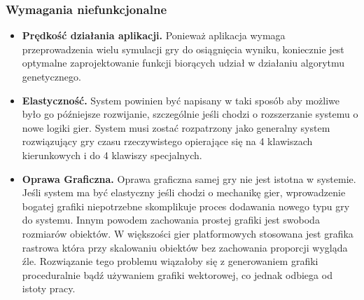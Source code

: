 \subsubsection{Wymagania niefunkcjonalne}
	\begin{itemize}
	\item {\bf Prędkość działania aplikacji. }	
	\newline
	Ponieważ aplikacja wymaga przeprowadzenia wielu symulacji gry do osiągnięcia wyniku, koniecznie jest optymalne zaprojektowanie funkcji biorących udział w działaniu algorytmu genetycznego.
	\item {\bf Elastyczność. }
	\newline
	System powinien być napisany w taki sposób aby możliwe było go późniejsze rozwijanie, szczególnie jeśli chodzi o rozszerzanie systemu o nowe logiki gier.
	System musi zostać rozpatrzony jako generalny system rozwiązujący gry czasu rzeczywistego opierające się na 4 klawiszach kierunkowych i do 4 klawiszy specjalnych.
	\item {\bf Oprawa Graficzna. }
	\newline
	Oprawa graficzna samej gry nie jest istotna w systemie. Jeśli system ma być elastyczny jeśli chodzi o mechanikę gier, wprowadzenie bogatej grafiki niepotrzebne skomplikuje proces dodawania nowego typu gry do systemu. 
	Innym powodem zachowania prostej grafiki jest swoboda rozmiarów obiektów. 
	W większości gier platformowych stosowana jest grafika rastrowa która przy skalowaniu obiektów bez zachowania proporcji wygląda źle.
	Rozwiązanie tego problemu wiązałoby się z generowaniem grafiki proceduralnie bądź używaniem grafiki wektorowej, co jednak odbiega od istoty pracy.
	\end{itemize}


